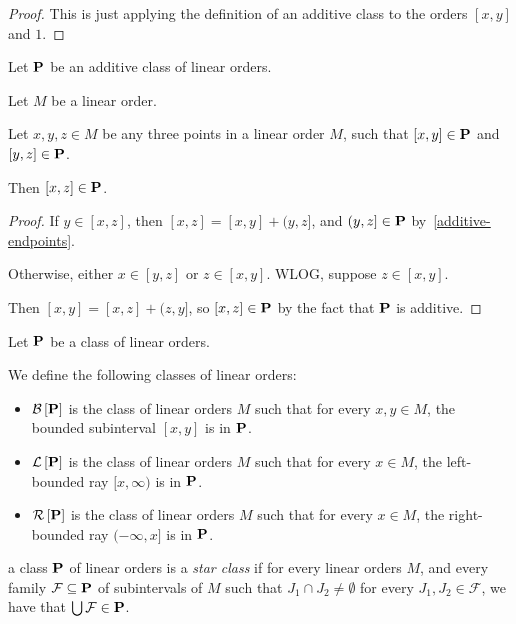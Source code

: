 \begin{proof}
  This is just applying the definition of an additive class
  to the orders $[x, y]$ and $1$.
\end{proof}

\begin{corollary}\label{additive-transitivity}
  Let $\mathbf{P}$ be an additive class of linear orders.

  Let $M$ be a linear order.

  Let $x, y, z \in M$ be any three points in a linear order $M$,
  such that $[x, y] \in \mathbf{P}$ and $[y, z] \in \mathbf{P}$.

  Then $[x, z] \in \mathbf{P}$.
\end{corollary}

\begin{proof}
  If $y \in [x, z]$, then $[x, z] = [x, y] + (y, z]$,
  and $(y, z] \in \mathbf{P}$ by~\cref{additive-endpoints}.

  Otherwise, either $x \in [y, z]$ or $z \in [x, y]$.
  WLOG, suppose $z \in [x, y]$.

  Then $[x, y] = [x, z] + (z, y]$,
  so $[x, z] \in \mathbf{P}$ by the fact that $\mathbf{P}$ is additive.
\end{proof}

\begin{definitions}
  Let $\mathbf{P}$ be a class of linear orders.

  We define the following classes of linear orders:
  \begin{itemize}
    \item $\mathcal{B} \left[ {{\mathbf{P}}} \right]$ is the class of linear orders $M$ such that for every $x, y \in M$,
          the bounded subinterval $[x, y]$ is in $\mathbf{P}$.
    \item $\mathcal{L} \left[ {{\mathbf{P}}} \right]$ is the class of linear orders $M$ such that for every $x \in M$,
          the left-bounded ray $[x, \infty)$ is in $\mathbf{P}$.
    \item $\mathcal{R} \left[ {{\mathbf{P}}} \right]$ is the class of linear orders $M$ such that for every $x \in M$,
          the right-bounded ray $(-\infty, x]$ is in $\mathbf{P}$.
  \end{itemize}
\end{definitions}

\begin{definition}
  a class $\mathbf{P}$ of linear orders is a \emph{star class} if
  for every linear orders $M$, and every family $\mathcal{F} \subseteq \mathbf{P}$
  of subintervals of $M$ such that $J_1 \cap J_2 \ne \emptyset$
  for every $J_1, J_2 \in \mathcal{F}$, we have that
  $\bigcup \mathcal{F} \in \mathbf{P}$.
\end{definition}

